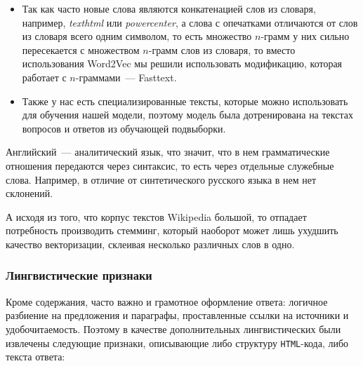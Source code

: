 \documentclass[../diploma.tex]{subfiles}
\begin{document}
   	\begin{itemize}
   		\item
   		Так как часто новые слова являются конкатенацией слов из словаря, например, \textit{texthtml} или \textit{powercenter}, 
   		а слова с опечатками отличаются от слов из словаря всего одним символом, 
   		то есть множество $n$-грамм у них сильно пересекается с множеством $n$-грамм слов из словаря,
       	то вместо использования Word2Vec мы решили использовать модификацию, которая работает с $n$-граммами~--- Fasttext.

   		\item
   		Также у нас есть специализированные тексты, которые можно использовать для обучения нашей модели, поэтому 
   		модель была дотренирована на текстах вопросов и ответов из обучающей подвыборки.

   	\end{itemize}

   	Английский~--- аналитический язык, что значит, что в нем грамматические отношения передаются через синтаксис, то есть через отдельные служебные слова.
   	Например, в отличие от синтетического русского языка в нем нет склонений.

   	А исходя из того, что корпус текстов Wikipedia большой, то отпадает потребность производить стемминг, который наоборот может лишь ухудшить качество векторизации, 
   	склеивая несколько различных слов в одно.

	\subsubsection{Лингвистические признаки}

   	Кроме содержания, часто важно и грамотное оформление ответа: логичное разбиение на предложения и параграфы, проставленные ссылки на источники и удобочитаемость.
   	Поэтому в качестве дополнительных лингвистических были извлечены следующие признаки, описывающие либо структуру \texttt{HTML}-кода, либо текста ответа:
\end{document}
